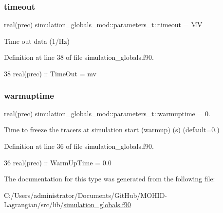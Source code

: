 \subsubsection{\texorpdfstring{timeout}{timeout}}
{\footnotesize\ttfamily real(prec) simulation\+\_\+globals\+\_\+mod\+::parameters\+\_\+t\+::timeout = MV\hspace{0.3cm}{\ttfamily [private]}}



Time out data (1/\+Hz) 



Definition at line 38 of file simulation\+\_\+globals.\+f90.


\begin{DoxyCode}
38         \textcolor{keywordtype}{real(prec)} :: TimeOut = mv          
\end{DoxyCode}
\mbox{\label{structsimulation__globals__mod_1_1parameters__t_aed7511e2225ac602d053476e4688d49a}} 
\subsubsection{\texorpdfstring{warmuptime}{warmuptime}}
{\footnotesize\ttfamily real(prec) simulation\+\_\+globals\+\_\+mod\+::parameters\+\_\+t\+::warmuptime = 0.\hspace{0.3cm}{\ttfamily [private]}}



Time to freeze the tracers at simulation start (warmup) (s) (default=0.) 



Definition at line 36 of file simulation\+\_\+globals.\+f90.


\begin{DoxyCode}
36         \textcolor{keywordtype}{real(prec)} :: WarmUpTime = 0.0
\end{DoxyCode}


The documentation for this type was generated from the following file\+:\begin{DoxyCompactItemize}
\item 
C\+:/\+Users/administrator/\+Documents/\+Git\+Hub/\+M\+O\+H\+I\+D-\/\+Lagrangian/src/lib/\mbox{\hyperlink{simulation__globals_8f90}{simulation\+\_\+globals.\+f90}}\end{DoxyCompactItemize}
